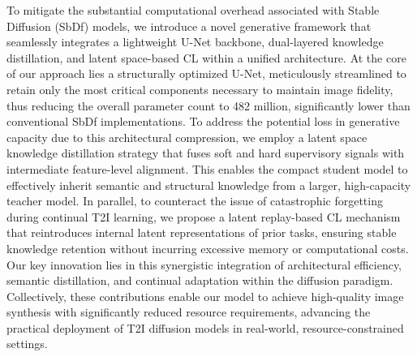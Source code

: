 \documentclass[a4paper,fleqn]{ieeetj}
\begin{document}
To mitigate the substantial computational overhead associated with Stable Diffusion (SbDf) models, we introduce a novel generative framework that seamlessly integrates a lightweight U-Net backbone, dual-layered knowledge distillation, and latent space-based CL within a unified architecture. At the core of our approach lies a structurally optimized U-Net, meticulously streamlined to retain only the most critical components necessary to maintain image fidelity, thus reducing the overall parameter count to 482 million, significantly lower than conventional SbDf implementations. To address the potential loss in generative capacity due to this architectural compression, we employ a latent space knowledge distillation strategy that fuses soft and hard supervisory signals with intermediate feature-level alignment. This enables the compact student model to effectively inherit semantic and structural knowledge from a larger, high-capacity teacher model. In parallel, to counteract the issue of catastrophic forgetting during continual T2I learning, we propose a latent replay-based CL mechanism that reintroduces internal latent representations of prior tasks, ensuring stable knowledge retention without incurring excessive memory or computational costs. Our key innovation lies in this synergistic integration of architectural efficiency, semantic distillation, and continual adaptation within the diffusion paradigm. Collectively, these contributions enable our model to achieve high-quality image synthesis with significantly reduced resource requirements, advancing the practical deployment of T2I diffusion models in real-world, resource-constrained settings.


\end{document}
